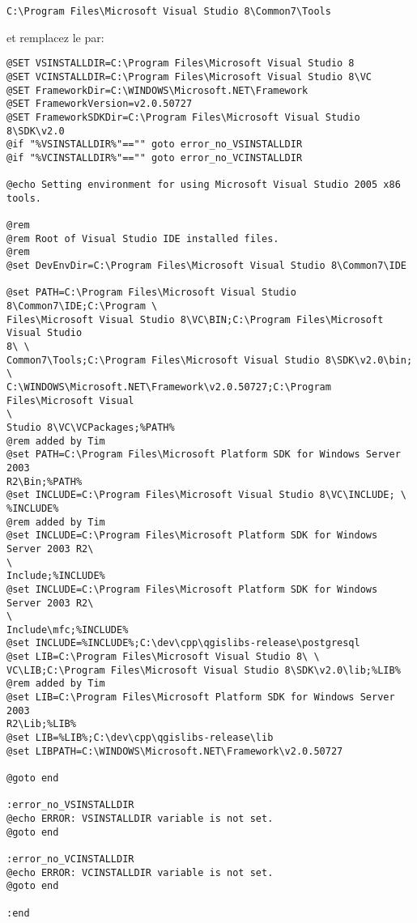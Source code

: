 \begin{verbatim}
C:\Program Files\Microsoft Visual Studio 8\Common7\Tools
\end{verbatim}

et remplacez le par:

\begin{verbatim}
@SET VSINSTALLDIR=C:\Program Files\Microsoft Visual Studio 8
@SET VCINSTALLDIR=C:\Program Files\Microsoft Visual Studio 8\VC
@SET FrameworkDir=C:\WINDOWS\Microsoft.NET\Framework
@SET FrameworkVersion=v2.0.50727
@SET FrameworkSDKDir=C:\Program Files\Microsoft Visual Studio 8\SDK\v2.0
@if "%VSINSTALLDIR%"=="" goto error_no_VSINSTALLDIR
@if "%VCINSTALLDIR%"=="" goto error_no_VCINSTALLDIR

@echo Setting environment for using Microsoft Visual Studio 2005 x86 tools.

@rem
@rem Root of Visual Studio IDE installed files.
@rem
@set DevEnvDir=C:\Program Files\Microsoft Visual Studio 8\Common7\IDE

@set PATH=C:\Program Files\Microsoft Visual Studio 8\Common7\IDE;C:\Program \
Files\Microsoft Visual Studio 8\VC\BIN;C:\Program Files\Microsoft Visual Studio
8\ \
Common7\Tools;C:\Program Files\Microsoft Visual Studio 8\SDK\v2.0\bin; \
C:\WINDOWS\Microsoft.NET\Framework\v2.0.50727;C:\Program Files\Microsoft Visual
\
Studio 8\VC\VCPackages;%PATH%
@rem added by Tim
@set PATH=C:\Program Files\Microsoft Platform SDK for Windows Server 2003
R2\Bin;%PATH%
@set INCLUDE=C:\Program Files\Microsoft Visual Studio 8\VC\INCLUDE; \
%INCLUDE%
@rem added by Tim
@set INCLUDE=C:\Program Files\Microsoft Platform SDK for Windows Server 2003 R2\
\
Include;%INCLUDE%
@set INCLUDE=C:\Program Files\Microsoft Platform SDK for Windows Server 2003 R2\
\
Include\mfc;%INCLUDE%
@set INCLUDE=%INCLUDE%;C:\dev\cpp\qgislibs-release\postgresql
@set LIB=C:\Program Files\Microsoft Visual Studio 8\ \
VC\LIB;C:\Program Files\Microsoft Visual Studio 8\SDK\v2.0\lib;%LIB%
@rem added by Tim
@set LIB=C:\Program Files\Microsoft Platform SDK for Windows Server 2003
R2\Lib;%LIB%
@set LIB=%LIB%;C:\dev\cpp\qgislibs-release\lib
@set LIBPATH=C:\WINDOWS\Microsoft.NET\Framework\v2.0.50727

@goto end

:error_no_VSINSTALLDIR
@echo ERROR: VSINSTALLDIR variable is not set. 
@goto end

:error_no_VCINSTALLDIR
@echo ERROR: VCINSTALLDIR variable is not set. 
@goto end

:end

\end{verbatim}

